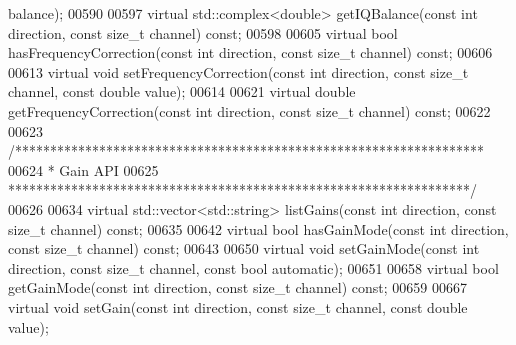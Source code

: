 \begin{DoxyCode}
      balance);
00590 
00597     \textcolor{keyword}{virtual} std::complex<double> getIQBalance(\textcolor{keyword}{const} \textcolor{keywordtype}{int} direction, \textcolor{keyword}{const} \textcolor{keywordtype}{size\_t} channel) \textcolor{keyword}{const};
00598 
00605     \textcolor{keyword}{virtual} \textcolor{keywordtype}{bool} hasFrequencyCorrection(\textcolor{keyword}{const} \textcolor{keywordtype}{int} direction, \textcolor{keyword}{const} \textcolor{keywordtype}{size\_t} channel) \textcolor{keyword}{const};
00606 
00613     \textcolor{keyword}{virtual} \textcolor{keywordtype}{void} setFrequencyCorrection(\textcolor{keyword}{const} \textcolor{keywordtype}{int} direction, \textcolor{keyword}{const} \textcolor{keywordtype}{size\_t} channel, \textcolor{keyword}{const} \textcolor{keywordtype}{double} value);
00614 
00621     \textcolor{keyword}{virtual} \textcolor{keywordtype}{double} getFrequencyCorrection(\textcolor{keyword}{const} \textcolor{keywordtype}{int} direction, \textcolor{keyword}{const} \textcolor{keywordtype}{size\_t} channel) \textcolor{keyword}{const};
00622 
00623     \textcolor{comment}{/*******************************************************************}
00624 \textcolor{comment}{     * Gain API}
00625 \textcolor{comment}{     ******************************************************************/}
00626 
00634     \textcolor{keyword}{virtual} std::vector<std::string> listGains(\textcolor{keyword}{const} \textcolor{keywordtype}{int} direction, \textcolor{keyword}{const} \textcolor{keywordtype}{size\_t} channel) \textcolor{keyword}{const};
00635 
00642     \textcolor{keyword}{virtual} \textcolor{keywordtype}{bool} hasGainMode(\textcolor{keyword}{const} \textcolor{keywordtype}{int} direction, \textcolor{keyword}{const} \textcolor{keywordtype}{size\_t} channel) \textcolor{keyword}{const};
00643 
00650     \textcolor{keyword}{virtual} \textcolor{keywordtype}{void} setGainMode(\textcolor{keyword}{const} \textcolor{keywordtype}{int} direction, \textcolor{keyword}{const} \textcolor{keywordtype}{size\_t} channel, \textcolor{keyword}{const} \textcolor{keywordtype}{bool} automatic);
00651 
00658     \textcolor{keyword}{virtual} \textcolor{keywordtype}{bool} getGainMode(\textcolor{keyword}{const} \textcolor{keywordtype}{int} direction, \textcolor{keyword}{const} \textcolor{keywordtype}{size\_t} channel) \textcolor{keyword}{const};
00659 
00667     \textcolor{keyword}{virtual} \textcolor{keywordtype}{void} setGain(\textcolor{keyword}{const} \textcolor{keywordtype}{int} direction, \textcolor{keyword}{const} \textcolor{keywordtype}{size\_t} channel, \textcolor{keyword}{const} \textcolor{keywordtype}{double} value);

\end{DoxyCode}
